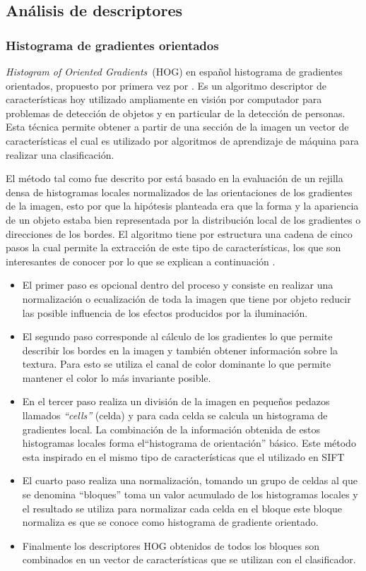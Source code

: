 \subsection{Análisis de descriptores}

\subsubsection{Histograma de gradientes orientados}
\label{descriptores:hog}

\textit{Histogram of Oriented Gradients}~(HOG) en español histograma de gradientes orientados, propuesto por primera vez por \cite{dalal2005}. Es un algoritmo descriptor de características hoy utilizado ampliamente en visión por computador para problemas de detección de objetos y en particular de la detección de personas. Esta técnica permite obtener a partir de una sección de la imagen un vector de características el cual es utilizado por algoritmos de aprendizaje de máquina para realizar una clasificación.

El método tal como fue descrito por \cite{dalal2006} está basado en la evaluación de un rejilla densa de histogramas locales normalizados de las orientaciones de los gradientes de la imagen, esto por que la hipótesis planteada era que la forma y la apariencia de un objeto estaba bien representada por la distribución local de los gradientes o direcciones de los bordes. El algoritmo tiene por estructura una cadena de cinco pasos la cual permite la extracción de este tipo de  características, los que son interesantes de conocer por lo que se explican a continuación .

\begin{itemize}
\item El primer paso es opcional dentro del proceso y consiste en realizar una normalización o ecualización de toda la imagen que tiene por objeto reducir las posible influencia de los efectos producidos por la iluminación.
\item El segundo paso corresponde al cálculo de los gradientes lo que permite describir los bordes en la imagen y también obtener información sobre la textura. Para esto se utiliza el canal de color dominante lo que permite mantener el color lo más invariante posible.
\item En el tercer paso realiza un división de la imagen en pequeños pedazos llamados \textit{``cells''} (celda) y para cada celda se calcula un histograma de gradientes local. La combinación de la información obtenida de estos histogramas locales forma el``histograma de orientación'' básico. Este método esta inspirado en el mismo tipo de características que el utilizado en SIFT \citep{Lowe2004}
\item El cuarto paso realiza una normalización, tomando un grupo de celdas al que se denomina ``bloques'' toma un valor acumulado de los histogramas locales y el resultado se utiliza para normalizar cada celda en el bloque este bloque normaliza es que se conoce como histograma de gradiente orientado.
\item Finalmente los descriptores HOG obtenidos de todos los bloques son combinados en un vector de características que se utilizan con el clasificador.
\end{itemize}

